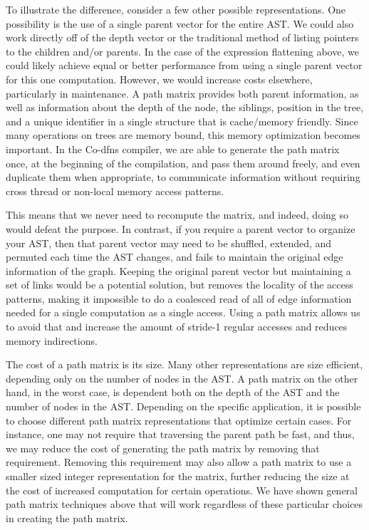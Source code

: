 ﻿\documentclass[numbers,10pt,preprint]{sigplanconf}
\begin{document}
To illustrate the difference, consider a few other possible representations. One possibility is the use of a single parent vector for the entire AST. We could also work directly off of the depth vector or the traditional method of listing pointers to the children and/or parents. In the case of the expression flattening above, we could likely achieve equal or better performance from using a single parent vector for this one computation. However, we would increase costs elsewhere, particularly in maintenance. A path matrix provides both parent information, as well as information about the depth of the node, the siblings, position in the tree, and a unique identifier in a single structure that is cache/memory friendly. Since many operations on trees are memory bound, this memory optimization becomes important. In the Co-dfns compiler, we are able to generate the path matrix once, at the beginning of the compilation, and pass them around freely, and even duplicate them when appropriate, to communicate information without requiring cross thread or non-local memory access patterns.

This means that we never need to recompute the matrix, and indeed, doing so would defeat the purpose. In contrast, if you require a parent vector to organize your AST, then that parent vector may need to be shuffled, extended, and permuted each time the AST changes, and fails to maintain the original edge information of the graph. Keeping the original parent vector but maintaining a set of links would be a potential solution, but removes the locality of the access patterns, making it impossible to do a coalesced read of all of edge information needed for a single computation as a single access. Using a path matrix allows us to avoid that and increase the amount of stride-1 regular accesses and reduces memory indirections.

The cost of a path matrix is its size. Many other representations are size efficient, depending only on the number of nodes in the AST. A path matrix on the other hand, in the worst case, is dependent both on the depth of the AST and the number of nodes in the AST. Depending on the specific application, it is possible to choose different path matrix representations that optimize certain cases. For instance, one may not require that traversing the parent path be fast, and thus, we may reduce the cost of generating the path matrix by removing that requirement. Removing this requirement may also allow a path matrix to use a smaller sized integer representation for the matrix, further reducing the size at the cost of increased computation for certain operations. We have shown general path matrix techniques above that will work regardless of these particular choices in creating the path matrix. 
\end{document}
